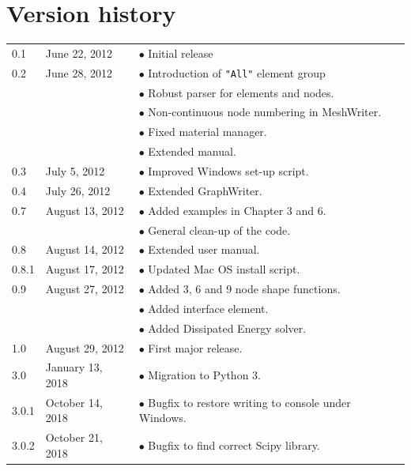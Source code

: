 \documentclass{article}
\begin{document}
\section{Version history}

\begin{tabular}{p{5mm}p{27mm}p{75mm}}
0.1 & June 22, 2012 &
$\bullet$ Initial release \\
0.2 & June 28, 2012 &
$\bullet$ Introduction of \texttt{"All"} element group \\
    & &
$\bullet$ Robust parser for elements and nodes.\\
   & &
$\bullet$ Non-continuous node numbering in MeshWriter.\\
 & &
$\bullet$ Fixed material manager.\\
 & &
$\bullet$ Extended manual.\\
0.3 & July 5, 2012 & 
$\bullet$ Improved Windows set-up script.\\
0.4 & July 26, 2012 & 
$\bullet$ Extended GraphWriter.\\
0.7 & August 13, 2012 & 
$\bullet$ Added examples in Chapter 3 and 6. \\
 & & 
$\bullet$ General clean-up of the code.\\
0.8 & August 14, 2012 & 
$\bullet$ Extended user manual.\\
0.8.1 & August 17, 2012 &
$\bullet$ Updated Mac OS install script.\\
0.9 &  August 27, 2012 &
$\bullet$ Added 3, 6 and 9 node shape functions.\\
 & & 
$\bullet$ Added interface element.\\
  & &
$\bullet$ Added Dissipated Energy solver.\\
1.0 &  August 29, 2012 &
$\bullet$ First major release.\\
3.0 &  January 13, 2018 &
$\bullet$ Migration to Python 3.\\
3.0.1 &  October 14, 2018 &
$\bullet$ Bugfix to restore writing to console under Windows.\\
3.0.2 &  October 21, 2018 &
$\bullet$ Bugfix to find correct Scipy library.\\

\end{tabular}
\end{document}
